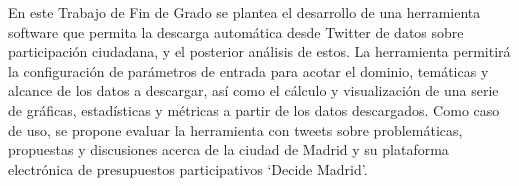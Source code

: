En este Trabajo de Fin de Grado se plantea el desarrollo de una herramienta software que permita la descarga automática desde Twitter de datos sobre participación ciudadana, y el posterior análisis de estos. La herramienta permitirá la configuración de parámetros de entrada para acotar el dominio, temáticas y alcance de los datos a descargar, así como el cálculo y visualización de una serie de gráficas, estadísticas y métricas a partir de los datos descargados. Como caso de uso, se propone evaluar la herramienta con tweets sobre problemáticas, propuestas y discusiones acerca de la ciudad de Madrid y su plataforma electrónica de presupuestos participativos ‘Decide Madrid’.